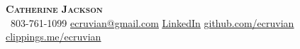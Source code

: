\begin{center}
    \textbf{\Huge \scshape Catherine Jackson} \\ \vspace{1pt}
     \ \small 803-761-1099 \quad
    \href{mailto:ecruvian@gmail.com}{ \underline{ecruvian@gmail.com}} \quad
    \href{https://www.linkedin.com/in/catherine-jackson-399630286}{ \underline{LinkedIn}} \quad
    \href{https://github.com/ecruvian}{ \underline{github.com/ecruvian}} \quad
    \href{https://www.clippings.me/ecruvian}
    { \underline{clippings.me/ecruvian}} 
\end{center}